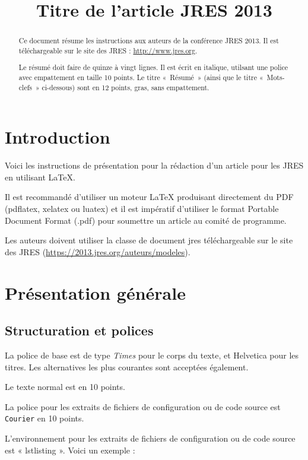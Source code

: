 \documentclass[city=Montpellier,year=2013]{jres}
\title{Titre de l'article JRES 2013}
\begin{document}
\maketitle

\begin{abstract}
Ce document résume les instructions aux auteurs de la conférence JRES 2013.
Il est téléchargeable sur le site des JRES : \url{http://www.jres.org}.

Le résumé doit faire de quinze à vingt lignes. Il est écrit en italique,
utilsant une police avec empattement en taille  10 points.
Le titre « Résumé » (ainsi que le titre «~Mots-clefs~» ci-dessous)
sont en 12 points, gras, sans empattement.
\end{abstract}


\section{Introduction}

Voici les instructions de présentation pour la rédaction d'un article
pour les JRES en utilisant \LaTeX{}.

Il est recommandé d'utiliser un moteur \LaTeX{} produisant directement
du PDF (pdflatex, xelatex ou luatex) et il est
impératif d'utiliser le format Portable Document Format (.pdf) pour
soumettre un article au comité de programme.

Les auteurs doivent utiliser la classe de document jres téléchargeable
sur le site des JRES (\url{https://2013.jres.org/auteurs/modeles}).

\section{Présentation générale}

\subsection{Structuration et polices}

La police de base est de type \emph{Times} pour le corps du texte, et
\textsf{Helvetica} pour les titres. Les alternatives les plus
courantes sont acceptées également.

Le texte  normal est en 10 points.

La police pour les extraits de fichiers de configuration ou de code
source est \texttt{Courier} en 10 points.

L'environnement pour les extraits de fichiers de configuration ou
de code source  est « lstlisting ». Voici un exemple :
\end{document}

